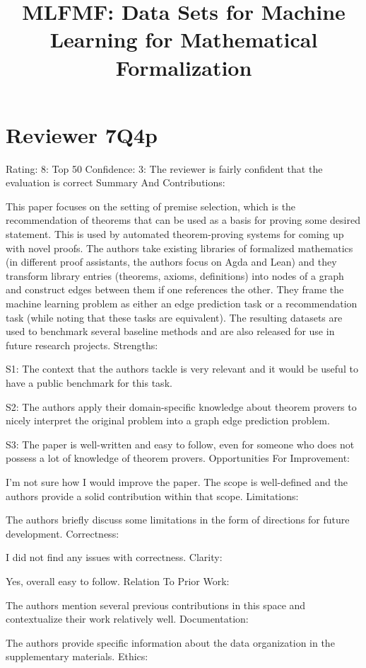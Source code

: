 \documentclass{article}
\title{MLFMF: Data Sets for Machine Learning for Mathematical Formalization}
\begin{document}
\section{Reviewer 7Q4p}

Rating: 8: Top 50%
Confidence: 3: The reviewer is fairly confident that the evaluation is correct
Summary And Contributions:

This paper focuses on the setting of premise selection, which is the recommendation of theorems that can be used as a basis for proving some desired statement. This is used by automated theorem-proving systems for coming up with novel proofs. The authors take existing libraries of formalized mathematics (in different proof assistants, the authors focus on Agda and Lean) and they transform library entries (theorems, axioms, definitions) into nodes of a graph and construct edges between them if one references the other. They frame the machine learning problem as either an edge prediction task or a recommendation task (while noting that these tasks are equivalent). The resulting datasets are used to benchmark several baseline methods and are also released for use in future research projects.
Strengths:

S1: The context that the authors tackle is very relevant and it would be useful to have a public benchmark for this task.

S2: The authors apply their domain-specific knowledge about theorem provers to nicely interpret the original problem into a graph edge prediction problem.

S3: The paper is well-written and easy to follow, even for someone who does not possess a lot of knowledge of theorem provers.
Opportunities For Improvement:

I'm not sure how I would improve the paper. The scope is well-defined and the authors provide a solid contribution within that scope.
Limitations:

The authors briefly discuss some limitations in the form of directions for future development.
Correctness:

I did not find any issues with correctness.
Clarity:

Yes, overall easy to follow.
Relation To Prior Work:

The authors mention several previous contributions in this space and contextualize their work relatively well.
Documentation:

The authors provide specific information about the data organization in the supplementary materials.
Ethics:
\end{document}
